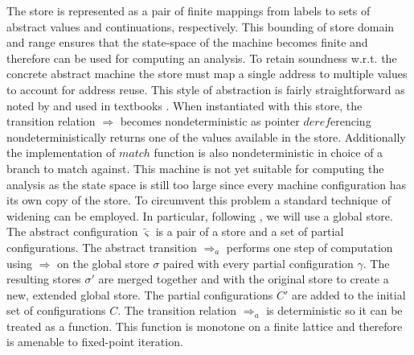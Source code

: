The store is represented as a pair of finite mappings from labels to sets of abstract values and continuations, respectively.
This bounding of store domain and range ensures that the state-space of the machine becomes finite and therefore can be used for computing an analysis.
To retain soundness w.r.t. the concrete abstract machine the store must map a single address to multiple values to account for address reuse.
This style of abstraction is fairly straightforward as noted by \cite{aam} and used in textbooks \cite{popa}.
When instantiated with this store, the transition relation $\Rightarrow$ becomes nondeterministic as pointer $\mathit{deref}$erencing nondeterministically returns one of the values available in the store.
Additionally the implementation of $\mathit{match}$ function is also nondeterministic in choice of a branch to match against.
This machine is not yet suitable for computing the analysis as the state space is still too large since every machine configuration has its own copy of the store.
To circumvent this problem a standard technique of widening \cite{popa} can be employed.
In particular, following \cite{aam}, we will use a global store.
The abstract configuration $\tilde{\varsigma}$ is a pair of a store and a set of partial configurations.
The abstract transition $\Rightarrow_a$ performs one step of computation using $\Rightarrow$ on the global store $\sigma$ paired with every partial configuration $\gamma$.
The resulting stores $\sigma'$ are merged together and with the original store to create a new, extended global store.
The partial configurations $C'$ are added to the initial set of configurations $C$.
The transition relation $\Rightarrow_a$ is deterministic so it can be treated as a function.
This function is monotone on a finite lattice and therefore is amenable to fixed-point iteration.


